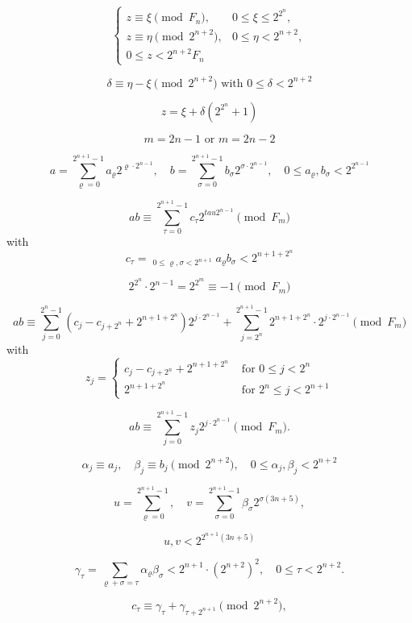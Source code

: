 \documentclass{article}
\begin{document}
\[
\tag{4.7}
\begin{cases}
z \equiv \xi \pmod{F_n}, & 0 \le \xi \le 2^{2^n}, \\
z \equiv \eta \pmod{2^{n + 2}}, & 0 \le \eta < 2^{n + 2}, \\
0 \le z < 2^{n + 2} F_n
\end{cases}
\]

\[
\delta \equiv \eta - \xi \pmod{2^{n + 2}}\text{ with }0 \le \delta < 2^{n + 2}
\]

\[
z = \xi + \delta\left(2^{2^n} + 1\right)
\]

\[
\tag{4.8}
m = 2n - 1\text{ or }m = 2n - 2
\]

\[
\tag{4.9}
a = \sum_{\varrho = 0}^{2^{n + 1} - 1} a_\varrho 2^{\varrho \cdot 2^{n - 1}}, \quad b = \sum_{\sigma = 0}^{2^{n + 1} - 1} b_\sigma 2^{\sigma \cdot 2^{n - 1}}, \quad 0 \le a_\varrho, b_\sigma < 2^{2^{n - 1}}
\]

\[
ab \equiv \sum_{\tau = 0}^{2^{n + 1} - 1} c_\tau 2^{tau 2^{n - 1}} \pmod{F_m}
\]
with
\[
\tag{4.10}
c_\tau = \mathop{\sum_{\varrho + \sigma \equiv \tau \pmod{2^{n + 1}}}}_{0 \le \varrho, \sigma < 2^{n + 1}} a_\varrho b_\sigma < 2^{n + 1 + 2^n}
\]

\[
2^{2^n} \cdot 2^{n - 1} = 2^{2^m} \equiv -1 \pmod{F_m}
\]

\[
ab \equiv \sum_{j = 0}^{2^n - 1} \left(c_j - c_{j + 2^n} + 2^{n + 1 + 2^n}\right) 2^{j \cdot 2^{n - 1}} + \sum_{j = 2^n}^{2^{n + 1} - 1} 2^{n + 1 + 2^n} \cdot 2^{j \cdot 2^{n - 1}} \pmod{F_m}
\]
with
\[
\tag{4.11}
z_j =
\begin{cases}
c_j - c_{j + 2^n} + 2^{n + 1 + 2^n} & \text{ for } 0 \le j < 2^n \\
2^{n + 1 + 2^n} & \text{ for } 2^n \le j < 2^{n + 1}
\end{cases}
\]

\[
\tag{4.12}
ab \equiv \sum_{j = 0}^{2^{n + 1} - 1} z_j 2^{j \cdot 2^{n - 1}} \pmod{F_m}.
\]

\[
\alpha_j \equiv a_j, \quad \beta_j \equiv b_j \pmod{2^{n + 2}}, \quad 0 \le \alpha_j, \beta_j < 2^{n + 2}
\]

\[
u = \sum_{\varrho = 0}^{2^{n + 1} - 1}, \quad v = \sum_{\sigma = 0}^{2^{n + 1} - 1} \beta_\sigma 2^{\sigma (3n + 5)},
\]

\[
u, v < 2^{2^{n + 1}(3n + 5)}
\]

\[
\gamma_\tau = \sum_{\varrho + \sigma = \tau} \alpha_\varrho \beta_\sigma < 2^{n + 1} \cdot \left(2^{n + 2}\right)^2, \quad 0 \le \tau < 2^{n + 2}.
\]

\[
c_\tau \equiv \gamma_\tau + \gamma_{\tau + 2^{n + 1}} \pmod{2^{n + 2}},
\]
\end{document}
